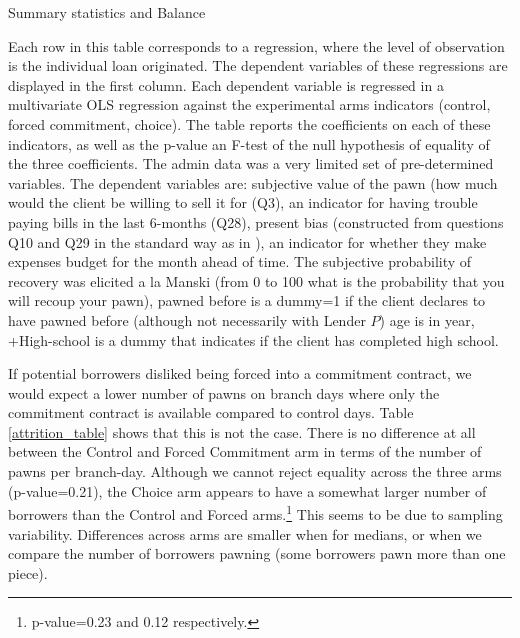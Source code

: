 \begin{appendix}
\begin{table}[!h]
\caption{Summary statistics and Balance}
\label{SS}
\begin{center}
\resizebox{0.65\textwidth}{!}{
\footnotesize{}
}
\end{center}
\footnotesize {Each row in this table corresponds to a regression, where the level of observation is the individual loan originated. The dependent variables of these regressions are displayed in the first column. Each dependent variable is regressed in a multivariate OLS regression against the experimental arms indicators (control, forced commitment, choice). The table reports the coefficients on each of these indicators, as well as the p-value an F-test of the null hypothesis of equality of the three coefficients. The admin data was a very limited set of pre-determined variables. The dependent variables are: subjective value of the pawn (how much would the client be willing to sell it for (Q3), an indicator for having trouble paying bills in the last 6-months (Q28), present bias (constructed from questions Q10 and Q29 in the standard way as in \cite{Ashraf}), an indicator for whether they make expenses budget for the month ahead of time. The subjective probability of recovery was elicited a la Manski (from 0 to 100 what is the probability that you will recoup your pawn), pawned before is a dummy=1 if the client declares to have pawned before (although not necessarily with Lender $P$) age is in year, +High-school is a dummy that indicates if the client has completed high school. 
}
\end{table}


If potential borrowers disliked being forced into a commitment contract, we would expect a lower number of pawns on branch days where only the commitment contract is available compared to control days. Table \ref{attrition_table} shows that this is not the case. There is no difference at all between the Control and Forced Commitment arm in terms of the number of pawns per branch-day. Although we cannot reject equality across the three arms (p-value=0.21), the Choice arm appears to have a somewhat larger number of borrowers than the Control and Forced arms.\footnote{p-value=0.23 and 0.12 respectively.} This seems to be due to sampling variability. Differences across arms are smaller when for medians, or when we compare the number of borrowers pawning (some borrowers pawn more than one piece). 


\end{appendix}
